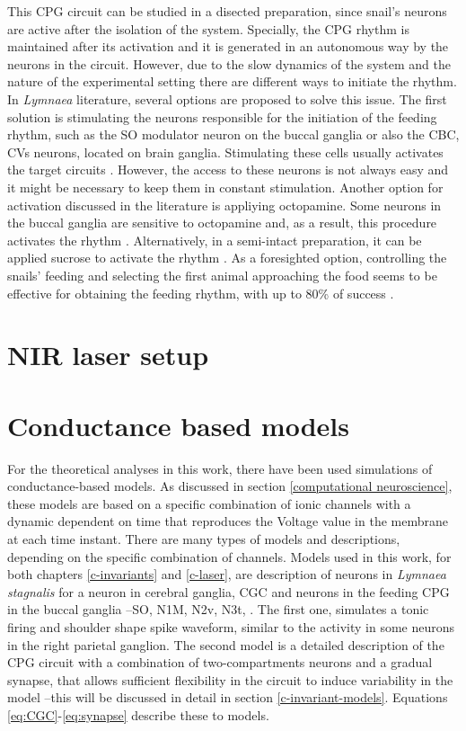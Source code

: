 This CPG circuit can be studied in a disected preparation, since snail's neurons are active after the isolation of the system. Specially, the CPG rhythm is maintained after its activation and it is generated in an autonomous way by the neurons in the circuit. However, due to the slow dynamics of the system and the nature of the experimental setting there are different ways to initiate the rhythm. In \textit{Lymnaea} literature, several options are proposed to solve this issue. The first solution is stimulating the neurons responsible for the initiation of the feeding rhythm, such as the SO modulator neuron on the buccal ganglia or also the CBC, CVs neurons, located on brain ganglia. Stimulating these cells usually activates the target circuits \cite{Benjamin2012}. However, the access to these neurons is not always easy and it might be necessary to keep them in constant stimulation. Another option for activation discussed in the literature is appliying octopamine. Some neurons in the buccal ganglia are sensitive to octopamine and, as a result, this procedure activates the rhythm \cite{Vehovszky2004}. Alternatively, in a semi-intact preparation, it can be applied sucrose to activate the rhythm \cite{Vavoulis2007,Vehovszky2004,Straub2002}. As a foresighted option, controlling the snails' feeding and selecting the first animal approaching the food seems to be effective for obtaining the feeding rhythm, with up to 80\% of success \cite{Elliott1991}.

\section{NIR laser setup}

\section{Conductance based models}
For the theoretical analyses in this work, there have been used simulations of conductance-based models. As discussed in section \ref{computational neuroscience}, these models are based on a specific combination of ionic channels with a dynamic dependent on time that reproduces the Voltage value in the membrane at each time instant. There are many types of models and descriptions, depending on the specific combination of channels. Models used in this work, for both chapters \ref{c-invariants} and \ref{c-laser}, are description of neurons in \textit{Lymnaea stagnalis} for a neuron in cerebral ganglia, CGC \parencite{vavoulis_balanced_2010} and neurons in the feeding CPG in the buccal ganglia --SO, N1M, N2v, N3t, \parencite{vavoulis_computational_2007}. The first one, simulates a tonic firing and shoulder shape spike waveform, similar to the activity in some neurons in the right parietal ganglion. The second model is a detailed description of the CPG circuit with a combination of two-compartments neurons and a gradual synapse, that allows sufficient flexibility in the circuit to induce variability in the model --this will be discussed in detail in section \ref{c-invariant-models}. Equations \ref{eq:CGC}-\ref{eq:synapse} describe these to models. 

